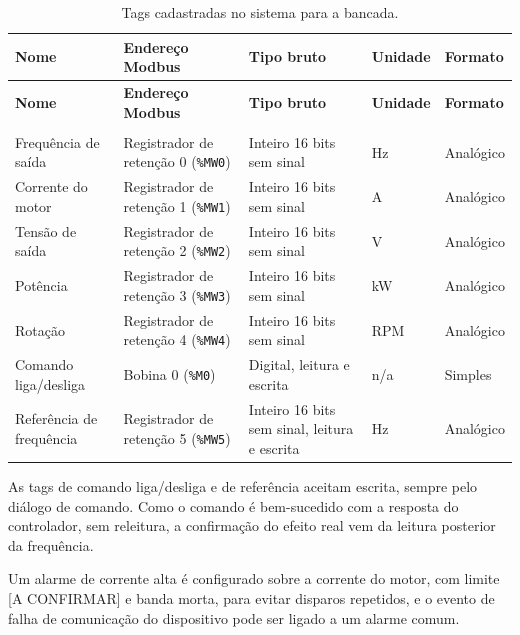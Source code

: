 {\renewcommand{\arraystretch}{1.3}\small
\begin{xltabular}{\textwidth}{>{\centering\arraybackslash}p{2.6cm}>{\centering\arraybackslash}p{2.8cm}>{\centering\arraybackslash}p{2.3cm}>{\centering\arraybackslash}p{1.7cm}>{\centering\arraybackslash}X}
        \caption{Tags cadastradas no sistema para a bancada.}
        \label{tab:cap6_tags}\\
        \hline
        \textbf{Nome} & \textbf{Endereço Modbus} & \textbf{Tipo bruto} & \textbf{Unidade} & \textbf{Formato} \\
        \hline
        \endfirsthead
        \hline
        \textbf{Nome} & \textbf{Endereço Modbus} & \textbf{Tipo bruto} & \textbf{Unidade} & \textbf{Formato} \\
        \hline
        \endhead
        \endfoot
         \\
        \endlastfoot
        Frequência de saída & Registrador de retenção 0 (\texttt{\%MW0}) & Inteiro 16 bits sem sinal & Hz & Analógico \\
        \hline
        Corrente do motor & Registrador de retenção 1 (\texttt{\%MW1}) & Inteiro 16 bits sem sinal & A & Analógico \\
        \hline
        Tensão de saída & Registrador de retenção 2 (\texttt{\%MW2}) & Inteiro 16 bits sem sinal & V & Analógico \\
        \hline
        Potência & Registrador de retenção 3 (\texttt{\%MW3}) & Inteiro 16 bits sem sinal & kW & Analógico \\
        \hline
        Rotação & Registrador de retenção 4 (\texttt{\%MW4}) & Inteiro 16 bits sem sinal & RPM & Analógico \\
        \hline
        Comando liga/desliga & Bobina 0 (\texttt{\%M0}) & Digital, leitura e escrita & n/a & Simples \\
        \hline
        Referência de frequência & Registrador de retenção 5 (\texttt{\%MW5}) & Inteiro 16 bits sem sinal, leitura e escrita & Hz & Analógico \\
        \hline
\end{xltabular}}

\par As tags de comando liga/desliga e de referência aceitam escrita, sempre pelo diálogo de comando. Como o comando é bem-sucedido com a resposta do controlador, sem releitura, a confirmação do efeito real vem da leitura posterior da frequência.

\par Um alarme de corrente alta é configurado sobre a corrente do motor, com limite [A CONFIRMAR] e banda morta, para evitar disparos repetidos, e o evento de falha de comunicação do dispositivo pode ser ligado a um alarme comum.

